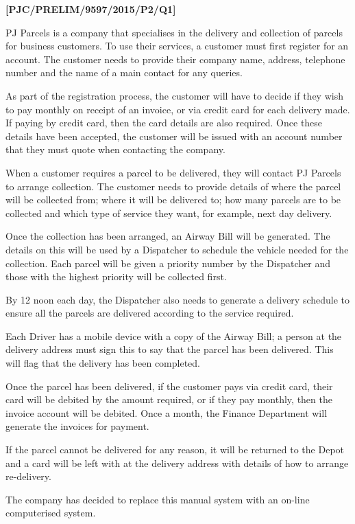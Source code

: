 \item \textbf{{[}PJC/PRELIM/9597/2015/P2/Q1{]} }

PJ Parcels is a company that specialises in the delivery and collection
of parcels for business customers. To use their services, a customer
must first register for an account. The customer needs to provide
their company name, address, telephone number and the name of a main
contact for any queries. 

As part of the registration process, the customer will have to decide
if they wish to pay monthly on receipt of an invoice, or via credit
card for each delivery made. If paying by credit card, then the card
details are also required. Once these details have been accepted,
the customer will be issued with an account number that they must
quote when contacting the company. 

When a customer requires a parcel to be delivered, they will contact
PJ Parcels to arrange collection. The customer needs to provide details
of where the parcel will be collected from; where it will be delivered
to; how many parcels are to be collected and which type of service
they want, for example, next day delivery. 

Once the collection has been arranged, an Airway Bill will be generated.
The details on this will be used by a Dispatcher to schedule the vehicle
needed for the collection. Each parcel will be given a priority number
by the Dispatcher and those with the highest priority will be collected
first. 

By 12 noon each day, the Dispatcher also needs to generate a delivery
schedule to ensure all the parcels are delivered according to the
service required.

Each Driver has a mobile device with a copy of the Airway Bill; a
person at the delivery address must sign this to say that the parcel
has been delivered. This will flag that the delivery has been completed. 

Once the parcel has been delivered, if the customer pays via credit
card, their card will be debited by the amount required, or if they
pay monthly, then the invoice account will be debited. Once a month,
the Finance Department will generate the invoices for payment. 

If the parcel cannot be delivered for any reason, it will be returned
to the Depot and a card will be left with at the delivery address
with details of how to arrange re-delivery.

The company has decided to replace this manual system with an on-line
computerised system. 

